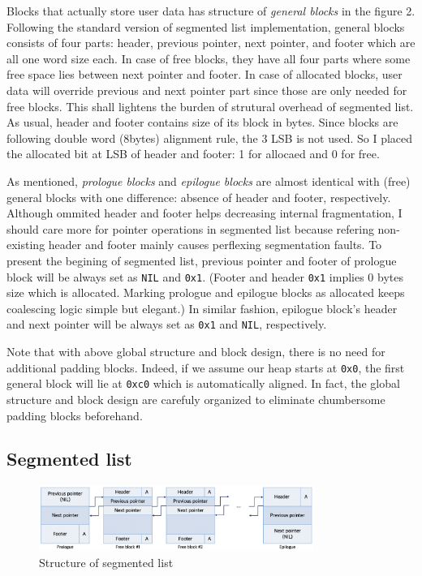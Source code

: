 \documentclass[fleqn]{article}
\begin{document}
Blocks that actually store user data has structure of \textit{general blocks} in the figure 2. Following the standard version of segmented list implementation, general blocks consists of four parts: header, previous pointer, next pointer, and footer which are all one word size each. In case of free blocks, they have all four parts where some free space lies between next pointer and footer. In case of allocated blocks, user data will override previous and next pointer part since those are only needed for free blocks. This shall lightens the burden of strutural overhead of segmented list. As usual, header and footer contains size of its block in bytes. Since blocks are following double word (8bytes) alignment rule, the 3 LSB is not used. So I placed the allocated bit at LSB of header and footer: 1 for allocaed and 0 for free.

As mentioned, \textit{prologue blocks} and \textit{epilogue blocks} are almost identical with (free) general blocks with one difference: absence of header and footer, respectively. Although ommited header and footer helps decreasing internal fragmentation, I should care more for pointer operations in segmented list because refering non-existing header and footer mainly causes perflexing segmentation faults. To present the begining of segmented list, previous pointer and footer of prologue block will be always set as \texttt{NIL} and \texttt{0x1}. (Footer and header \texttt{0x1} implies 0 bytes size which is allocated. Marking prologue and epilogue blocks as allocated keeps coalescing logic simple but elegant.) In similar fashion, epilogue block's header and next pointer will be always set as \texttt{0x1} and \texttt{NIL}, respectively.

Note that with above global structure and block design, there is no need for additional padding blocks. Indeed, if we assume our heap starts at \texttt{0x0}, the first general block will lie at \texttt{0xc0} which is automatically aligned. In fact, the global structure and block design are carefuly organized to eliminate chumbersome padding blocks beforehand.

\subsection{Segmented list}

\begin{figure}[ht!]
    \centering
    \includegraphics[width = 0.8\textwidth]{segl_struct}
    \caption{Structure of segmented list}
\end{figure}
\end{document}
